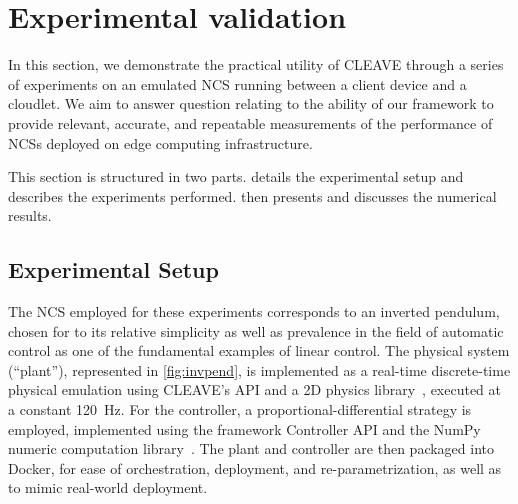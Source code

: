 \section{Experimental validation}\label{sec:experiments}



In this section, we demonstrate the practical utility of \ac{CLEAVE} through a series of experiments on an emulated \ac{NCS} running between a client device and a cloudlet.
We aim to answer question relating to the ability of our framework to provide relevant, accurate, and repeatable measurements of the performance of \acp{NCS} deployed on edge computing infrastructure.

This section is structured in two parts.
 details the experimental setup and describes the experiments performed.
 then presents and discusses the numerical results.

\subsection{Experimental Setup}\label{ssec:expsetup}

The \acl{NCS} employed for these experiments corresponds to an inverted pendulum, chosen for to its relative simplicity as well as prevalence in the field of automatic control as one of the fundamental examples of linear control.
The physical system (``plant''), represented in \cref{fig:invpend}, is implemented as a real-time discrete-time physical emulation using CLEAVE's API and a 2D physics library~\autocite{chipmunk2d,pymunk}, executed at a constant \SI{120}{\hertz}.
For the controller, a proportional-differential strategy is employed, implemented using the framework Controller API and the NumPy numeric computation library~\autocite{harris2020array}.
The plant and controller are then packaged into Docker\cite{merkel2014docker}, for ease of orchestration, deployment, and re-parametrization, as well as to mimic real-world deployment.

